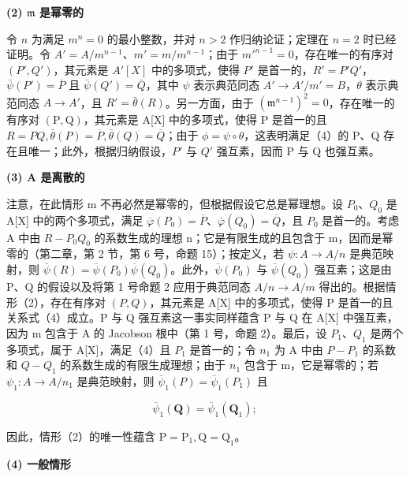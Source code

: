 \textbf{(2) \(\mathfrak{m}\) 是幂零的}\par

令 \(n\) 为满足 \(m^n = 0\) 的最小整数，并对 \(n > 2\) 作归纳论证；定理在 \(n = 2\) 时已经证明。令 \(A' = A / m^{n-1}\)、\(m' = m / m^{n-1}\)；由于 \(m'^{n-1} = 0\)，存在唯一的有序对 \((P', Q')\)，其元素是 \(A'[X]\) 中的多项式，使得 \(P'\) 是首一的，\(R' = P'Q'\)，\(\bar{\psi}(P') = \overline{P}\) 且 \(\bar{\psi}(Q') = \overline{Q}\)，其中 \(\psi\) 表示典范同态 \(A' \to A'/m' = B\)，\(\theta\) 表示典范同态 \(A \to A'\)，且 \(R' = \bar{\theta}(R)\)。另一方面，由于 \((\mathfrak{m}^{n-1})^{2}=0\)，存在唯一的有序对 \((\mathrm{P},\mathrm{Q})\)，其元素是 A{[}X{]} 中的多项式，使得 P 是首一的且 \(R=PQ,\bar{\theta}(P)=\overline{P},\bar{\theta}(Q)=\overline{Q}\)；由于 \(\phi=\psi\circ\theta\)，这表明满足（4）的 P、Q 存在且唯一；此外，根据归纳假设，\(P'\) 与 \(Q'\) 强互素，因而 P 与 Q 也强互素。

\textbf{(3) A 是离散的}\par

注意，在此情形 m 不再必然是幂零的，但根据假设它总是幂理想。设 \(P_{0}\)、\(Q_{0}\) 是 A{[}X{]} 中的两个多项式，满足 \(\overline{\varphi}(P_{0}) = \overline{P}\)、\(\overline{\varphi}(Q_{0}) = \overline{Q}\)，且 \(P_{0}\) 是首一的。考虑 A 中由 \(R - P_{0}Q_{0}\) 的系数生成的理想 n；它是有限生成的且包含于 m，因而是幂零的（第二章，第 2 节，第 6 号，命题 15）；按定义，若 \(\psi: A \to A/n\) 是典范映射，则 \(\overline{\psi}(R) = \overline{\psi}(P_{0})\overline{\psi}(Q_{0})\)。此外，\(\overline{\psi}(P_{0})\) 与 \(\overline{\psi}(Q_{0})\) 强互素；这是由 P、Q 的假设以及将第 1 号命题 2 应用于典范同态 \(A/n \to A/m\) 得出的。根据情形（2），存在有序对 \((P, Q)\)，其元素是 A{[}X{]} 中的多项式，使得 P 是首一的且关系式（4）成立。P 与 Q 强互素这一事实同样蕴含 P 与 Q 在 A{[}X{]} 中强互素，因为 m 包含于 A 的 Jacobson 根中（第 1 号，命题 2）。最后，设 \(P_{1}\)、\(Q_{1}\) 是两个多项式，属于 A{[}X{]}，满足（4）且 \(P_{1}\) 是首一的；令 \(n_{1}\) 为 A 中由 \(P - P_{1}\) 的系数和 \(Q - Q_{1}\) 的系数生成的有限生成理想；由于 \(n_{1}\) 包含于 m，它是幂零的；若 \(\psi_{1}: A \to A/n_{1}\) 是典范映射，则 \(\overline{\psi}_{1}(P) = \overline{\psi}_{1}(P_{1})\) 且

\[
\overline {{{{\psi}}}} _ {1} (\mathbf {Q}) = \overline {{{{\psi}}}} _ {1} (\mathbf {Q} _ {1});
\]

因此，情形（2）的唯一性蕴含 \(\mathrm{P} = \mathrm{P}_1, \mathrm{Q} = \mathrm{Q}_1\)。

\textbf{(4) 一般情形}\par

